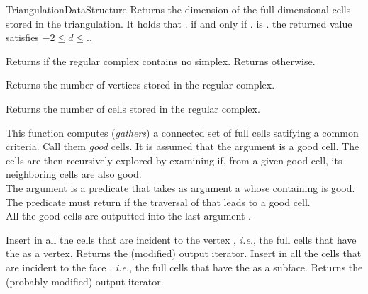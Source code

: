 \begin{ccRefConcept}{TriangulationDataStructure}
 { Returns the dimension of the
full dimensional cells stored in the triangulation. It holds that
\ccVar. if and only if \ccVar. is
. \ccPostcond the returned value  satisfies 
$-2\leq d \leq$\ccVar.. }

 { Returns  if the regular complex
contains no simplex. Returns  otherwise. }

{Returns the number of vertices stored in the regular complex.}

{Returns the number of cells stored in the regular complex.}

{}

{}

{This function computes (\emph{gathers}) a connected set of full cells
satifying a common criteria. Call them \emph{good} cells. It is assumed
that the argument  is a good cell. The cells are then
recursively explored by examining if, from a given good cell, its neighboring
cells are also good.\\
The argument  is a predicate that takes as argument a 
whose containing  is good. The predicate must return 
if the traversal of that  leads to a good cell.\\
All the good cells are outputted into the last argument .}

{Insert in  all the cells that are incident to the vertex
, \emph{i.e.}, the full cells that have the  as a vertex.
Returns the (modified) output iterator.
}
{Insert in  all the cells that are incident to the face ,
\emph{i.e.}, the full cells that have the  as a subface.
Returns the (probably modified) output iterator.
}


\end{ccRefConcept}
